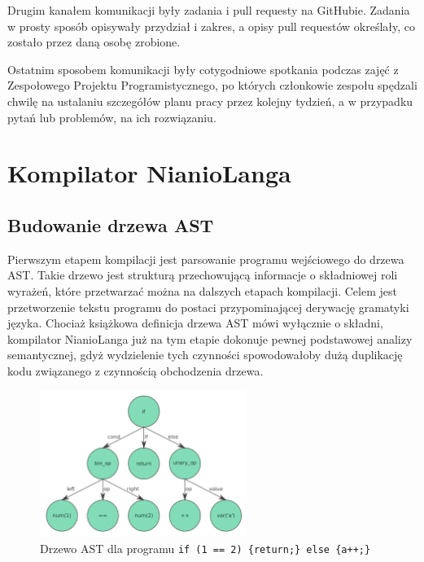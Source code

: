 \documentclass[licencjacka]{pracamgr}
\begin{document}
Drugim kanałem komunikacji były zadania i pull requesty na GitHubie. Zadania w prosty sposób
opisywały przydział i zakres, a opisy pull requestów określały, co zostało przez daną osobę zrobione.

Ostatnim sposobem komunikacji były cotygodniowe spotkania podczas zajęć z Zespołowego
Projektu Programistycznego, po których członkowie zespołu spędzali chwilę na ustalaniu
szczegółów planu pracy przez kolejny tydzień, a w przypadku pytań lub problemów, na ich rozwiązaniu.

\chapter{Kompilator NianioLanga}
\label{sec:compiler}
\section{Budowanie drzewa AST}
Pierwszym etapem kompilacji jest parsowanie programu wejściowego do drzewa AST. Takie drzewo jest strukturą przechowującą informacje o składniowej
roli wyrażeń, które przetwarzać można na dalszych etapach kompilacji. Celem jest przetworzenie tekstu programu do postaci przypominającej derywację
gramatyki języka. Chociaż książkowa definicja drzewa AST mówi wyłącznie o składni, kompilator NianioLanga już na tym etapie dokonuje pewnej
podstawowej analizy semantycznej, gdyż wydzielenie tych czynności spowodowałoby dużą duplikację kodu związanego z czynnością obchodzenia drzewa.

\begin{figure}[h]
  \centering
  \includegraphics[width=0.6\textwidth]{files/ast.png}
  \caption{Drzewo AST dla programu \texttt{if (1 == 2) \{return;\} else \{a++;\}}}
  \label{img:ast}
\end{figure}
\end{document}
